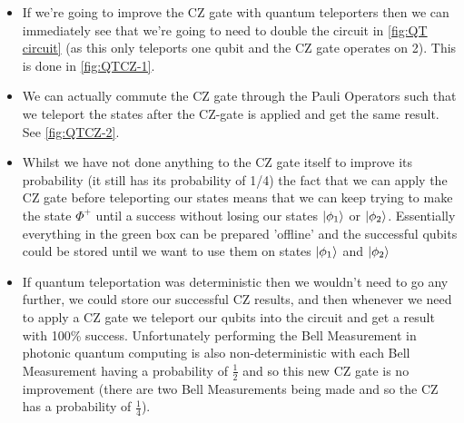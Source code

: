 \begin{itemize}
    \item If we're going to improve the CZ gate with quantum teleporters then we can immediately see that we're going to need to double the circuit in \ref{fig:QT circuit} (as this only teleports one qubit and the CZ gate operates on 2). This is done in \ref{fig:QTCZ-1}.
    \item We can actually commute the CZ gate through the Pauli Operators such that we teleport the states after the CZ-gate is applied and get the same result. See \ref{fig:QTCZ-2}. 
    \item Whilst we have not done anything to the CZ gate itself to improve its probability (it still has its probability of 1/4) the fact that we can apply the CZ gate before teleporting our states means that we can keep trying to make the state $\Phi^+$ until a success without losing our states $\ket{\phi_1}$ or $\ket{\phi_2}$. Essentially everything in the green box can be prepared 'offline' and the successful qubits could be stored until we want to use them on states $\ket{\phi_1}$ and $\ket{\phi_2}$
    \item If quantum teleportation was deterministic then we wouldn't need to go any further, we could store our successful CZ results, and then whenever we need to apply a CZ gate we teleport our qubits into the circuit and get a result with 100\% success. Unfortunately performing the Bell Measurement in photonic quantum computing is also non-deterministic with each Bell Measurement having a probability of $\frac{1}{2}$ and so this new CZ gate is no improvement (there are two Bell Measurements being made and so the CZ has a probability of $\frac{1}{4}$).
\end{itemize}


